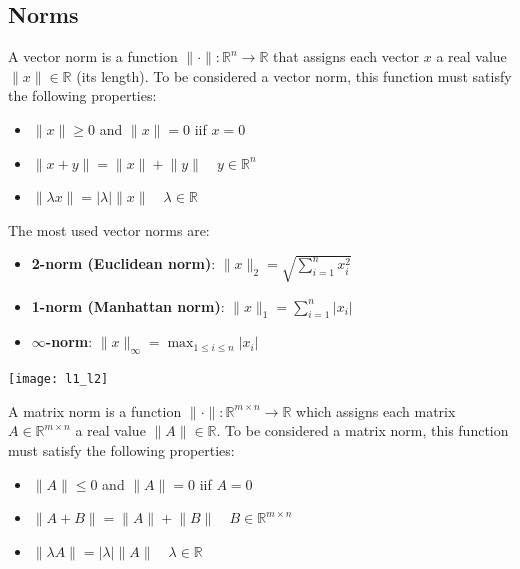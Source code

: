 \documentclass{article}
\begin{document}
\subsection{Norms}
\begin{definition}
    A vector norm is a function $\lVert \cdot\rVert:\mathbb{R}^n\to
    \mathbb{R}$ that assigns each vector $x$ a real value $\lVert x\rVert\in
    \mathbb{R}$ (its length). To be considered a vector norm, this function
    must satisfy the following properties:
    \begin{itemize}
       \item $\lVert x\rVert\geq 0$ and $\lVert x\rVert=0$
           iif $x=0$
       \item $\lVert x+y\rVert=\lVert x\rVert+ \lVert
           y\rVert \quad y\in \mathbb{R}^n$
       \item $\lVert \lambda x\rVert=\left\lvert
           \lambda\right\rvert \lVert x\rVert \quad \lambda\in \mathbb{R}$
    \end{itemize}
\end{definition}
The most used vector norms are:
\begin{itemize}
    \item \textbf{2-norm (Euclidean norm)}: $\lVert
        x\rVert_2=\sqrt{\sum_{i=1}^{n}x_i^2}$
    \item \textbf{1-norm (Manhattan norm)}: $\lVert x\rVert_1=\sum_{i=1}^{n}\left\lvert x_i\right\rvert$
    \item \textbf{$\infty$-norm}: $\lVert x\rVert_{\infty}=\max_{1\leq i\leq
        n}\left\lvert x_i\right\rvert$
\end{itemize}
\begin{center}
    \texttt{[image: l1\_l2]}
\end{center}
\begin{definition}
    A matrix norm is a function $\lVert \cdot\rVert :\mathbb{R}^{m\times n}\to
    \mathbb{R}$ which assigns each matrix $A\in \mathbb{R}^{m\times n}$ a
    real value $\lVert A\rVert\in \mathbb{R}$. To be considered a matrix norm,
    this function must satisfy the following properties:
    \begin{itemize}
        \item $\lVert A\rVert\leq 0$ and $\lVert A\rVert =0$ iif $A=0$ 
        \item $\lVert A+B\rVert=\lVert A\rVert+ \lVert
            B\rVert \quad B\in \mathbb{R}^{m\times n}$
        \item $\lVert \lambda A\rVert=\left\lvert
           \lambda\right\rvert \lVert A\rVert \quad \lambda\in \mathbb{R}$
    \end{itemize}
\end{definition}
\end{document}
